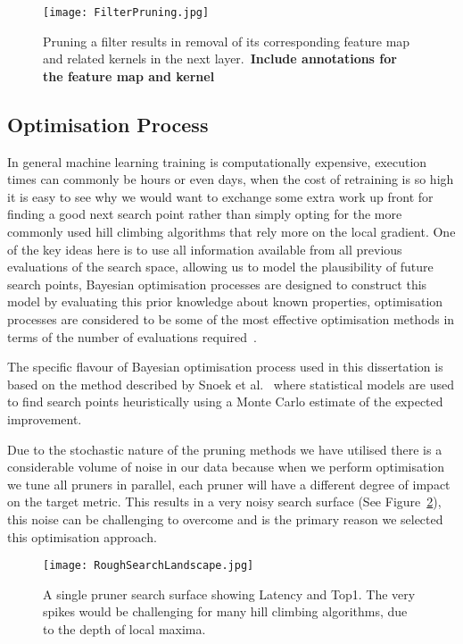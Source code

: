\documentclass[../Dissertation.tex]{subfiles}
\begin{document}
    \begin{figure}[H]
        \centering
        \texttt{[image: FilterPruning.jpg]}
        \caption{Pruning a filter results in removal of its corresponding feature map and related kernels in the next layer.~\autocite{liPruningFiltersEfficient2017}\textbf{\color{red}Include annotations for the feature map and kernel}}
        \label{fig:FeaturemapAndKernel}
    \end{figure}

\subsection{Optimisation Process}
In general machine learning training is computationally expensive, execution times can commonly be hours or even days, when the cost of retraining is so high it is easy to see why we would want to exchange some extra work up front for finding a good next search point rather than simply opting for the more commonly used hill climbing algorithms that rely more on the local gradient.
One of the key ideas here is to use all information available from all previous evaluations of the search space, allowing us to model the plausibility of future search points, Bayesian optimisation processes are designed to construct this model by evaluating this prior knowledge about known properties, optimisation processes are considered to be some of the most effective optimisation methods in terms of the number of evaluations required~\autocite{brochuTutorialBayesianOptimization2010}.

The specific flavour of Bayesian optimisation process used in this dissertation is based on the method described by Snoek et al.~\autocite{snoekPracticalBayesianOptimization2012} where statistical models are used to find search points heuristically using a Monte Carlo estimate of the expected improvement.
 
Due to the stochastic nature of the pruning methods we have utilised there is a considerable volume of noise in our data because when we perform optimisation we tune all pruners in parallel, each pruner will have a different degree of impact on the target metric.
This results in a very noisy search surface (See Figure~\ref{fig:roughSurface}), this noise can be challenging to overcome and is the primary reason we selected this optimisation approach.
\begin{figure}[H]
    \centering
    \texttt{[image: RoughSearchLandscape.jpg]}
    \caption{A single pruner search surface showing Latency and Top1. The very spikes would be challenging for many hill climbing algorithms, due to the depth of local maxima.}
    \label{fig:roughSurface}
\end{figure}
\end{document}
